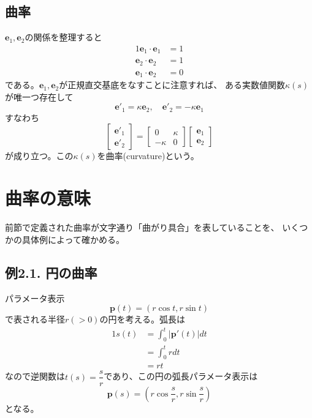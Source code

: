 \documentclass[a4j,disablejfam,dvipdfmx,papersize,slide,uplatex,21pt]{jsarticle}
\begin{document}
\subsection*{曲率}
$\bm{e}_1, \bm{e}_2$の関係を整理すると
\begin{alignat}{1}
    \bm{e}_1 \cdot \bm{e}_1 &= 1 \\
    \bm{e}_2 \cdot \bm{e}_2 &= 1 \\
    \bm{e}_1 \cdot \bm{e}_2 &= 0
\end{alignat}
である。$\bm{e}_1, \bm{e}_2$が正規直交基底をなすことに注意すれば、
ある実数値関数$\kappa(s)$が唯一つ存在して
\begin{equation}
    \bm{e}'_1 = \kappa \bm{e}_2,\quad
    \bm{e}'_2 = - \kappa \bm{e}_1
\end{equation}
すなわち
\begin{equation}
    \left[
        \begin{array}{c}
            \bm{e}'_1 \\
            \bm{e}'_2
        \end{array}
    \right]
    =
    \left[
        \begin{array}{cc}
            0 & \kappa \\
            -\kappa & 0
        \end{array}
    \right]
    \left[
        \begin{array}{c}
            \bm{e}_1 \\
            \bm{e}_2
        \end{array}
    \right]
\end{equation}
が成り立つ。この$\kappa(s)$を曲率(curvature)という。




\section{曲率の意味}
前節で定義された曲率が文字通り「曲がり具合」を表していることを、
いくつかの具体例によって確かめる。

\newpage
\subsection*{例2.1. 円の曲率}
パラメータ表示
\begin{equation}
    \bm{p}(t) = (r \cos t, r \sin t)
\end{equation}
で表される半径$r (> 0)$の円を考える。弧長は
\begin{alignat}{1}
    s(t) &= \int_0^t |\bm{p}'(t)| dt \\
        &= \int_0^t r dt \\
        &= rt
\end{alignat}
なので逆関数は$t(s) = \dfrac{s}{r}$であり、この円の弧長パラメータ表示は
\begin{equation}
    \bm{p}(s) = \left(r \cos \frac{s}{r}, r \sin \frac{s}{r}\right)
\end{equation}
となる。
\end{document}
